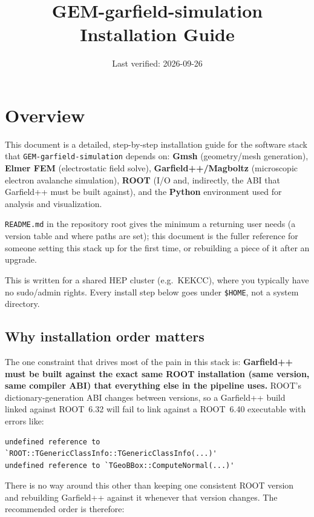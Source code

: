 \documentclass[11pt]{article}
\title{GEM-garfield-simulation \\ \large Installation Guide}
\author{}
\date{Last verified: 2026-09-26}
\begin{document}
\maketitle

\tableofcontents

\section{Overview}

This document is a detailed, step-by-step installation guide for the
software stack that \texttt{GEM-garfield-simulation} depends on:
\textbf{Gmsh} (geometry/mesh generation), \textbf{Elmer FEM}
(electrostatic field solve), \textbf{Garfield++/Magboltz} (microscopic
electron avalanche simulation), \textbf{ROOT} (I/O and, indirectly, the
ABI that Garfield++ must be built against), and the \textbf{Python}
environment used for analysis and visualization.

\texttt{README.md} in the repository root gives the minimum a returning
user needs (a version table and where paths are set); this document is
the fuller reference for someone setting this stack up for the first
time, or rebuilding a piece of it after an upgrade.

This is written for a shared HEP cluster (e.g.\ KEKCC), where you
typically have no sudo/admin rights. Every install step below goes under
\texttt{\$HOME}, not a system directory.

\subsection{Why installation order matters}

The one constraint that drives most of the pain in this stack is:
\textbf{Garfield++ must be built against the exact same ROOT installation
(same version, same compiler ABI) that everything else in the pipeline
uses.} ROOT's dictionary-generation ABI changes between versions, so a
Garfield++ build linked against ROOT~6.32 will fail to link against a
ROOT~6.40 executable with errors like:

\begin{lstlisting}
undefined reference to `ROOT::TGenericClassInfo::TGenericClassInfo(...)'
undefined reference to `TGeoBBox::ComputeNormal(...)'
\end{lstlisting}

There is no way around this other than keeping one consistent ROOT
version and rebuilding Garfield++ against it whenever that version
changes. The recommended order is therefore:
\end{document}
